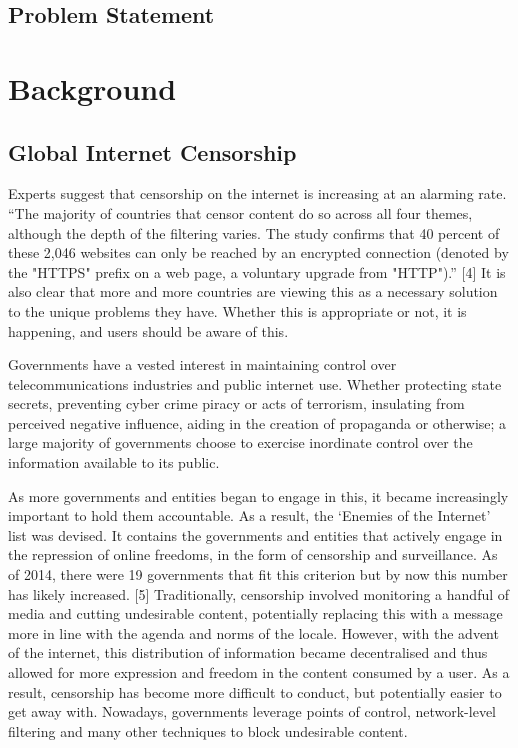 \subsection{Problem Statement}

\section{Background}
\subsection{Global Internet Censorship}
Experts suggest that censorship on the internet is increasing at an alarming rate. “The majority 
of countries that censor content do so across all four themes, although the depth of the filtering 
varies. The study confirms that 40 percent of these 2,046 websites can only be reached by an 
encrypted connection (denoted by the "HTTPS" prefix on a web page, a voluntary upgrade from 
"HTTP").” [4] It is also clear that more and more countries are viewing this as a necessary 
solution to the unique problems they have. Whether this is appropriate or not, it is happening, 
and users should be aware of this. 

Governments have a vested interest in maintaining control over telecommunications industries 
and public internet use. Whether protecting state secrets, preventing cyber crime piracy or acts 
of terrorism, insulating from perceived negative influence, aiding in the creation of propaganda 
or otherwise; a large majority of governments choose to exercise inordinate control over the 
information available to its public.  

As more governments and entities began to engage in this, it became increasingly important to 
hold them accountable. As a result, the ‘Enemies of the Internet’ list was devised. It contains 
the governments and entities that actively engage in the repression of online freedoms,  in the form of censorship and surveillance. As of 2014, there were 19 governments that fit this criterion but by now this number has likely increased. [5] Traditionally, censorship involved monitoring a handful of media and cutting undesirable content, potentially replacing this with a message more in line with the agenda and norms of the locale. However, with the advent of the internet, this distribution of information became decentralised and thus allowed for more expression and freedom in the content consumed by a user. As a result, censorship has become more difficult to conduct, but potentially easier to get away with. Nowadays, governments leverage points of control, network-level filtering and many other techniques to block undesirable content.

